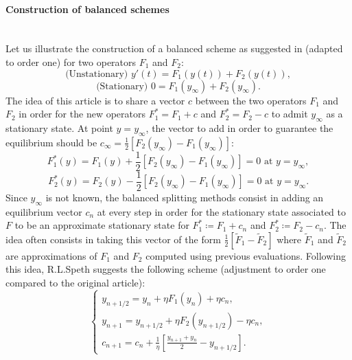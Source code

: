 \paragraph{Construction of balanced schemes}
~~\\
Let us illustrate the construction of a balanced scheme as suggested in \cite{rebalanced_splitting} (adapted to order one) for two operators $F_1$ and $F_2$:
\begin{equation*}
	\text{(Unstationary) } y'(t) = F_1(y(t)) + F_2(y(t)),
\end{equation*}
\begin{equation*}
	\text{(Stationary) } 0 = F_1(y_{\infty}) + F_2(y_{\infty}).
\end{equation*}
The idea of this article is to share a vector $c$ between the two operators $F_1$ and $F_2$ in order for the new operators $F_1^* = F_1+c$ and $F_2^*=F_2-c$ to admit $y_{\infty}$ as a stationary state. At point $y=y_{\infty}$, the vector to add in order to guarantee the equilibrium should be $c_{\infty} = \frac{1}{2} \left[F_2(y_{\infty})-F_1(y_{\infty})\right]$:
\begin{equation*}
	F_1^*(y) =  F_1(y) + \frac{1}{2} \left[F_2(y_{\infty})-F_1(y_{\infty})\right] = 0 \text{ at } y=y_{\infty},
\end{equation*}
\begin{equation*}
	F_2^*(y) =  F_2(y) - \frac{1}{2} \left[F_2(y_{\infty})-F_1(y_{\infty})\right] = 0 \text{ at } y=y_{\infty}.
\end{equation*}
Since $y_{\infty}$ is not known, the balanced splitting methods consist in adding an equilibrium vector $c_n$ at every step in order for the stationary state associated to $F$ to be an approximate stationary state for $F_1^* \coloneqq F_1+c_n$ and $F_2^*\coloneqq F_2-c_n$. The idea often consists in taking this vector of the form $\frac{1}{2}\left[\tilde{F}_1-\tilde{F}_2\right]$ where $\tilde{F}_1$ and $\tilde{F}_2$ are approximations of $F_1$ and $F_2$ computed using previous evaluations. Following this idea, R.L.Speth suggests the following scheme \cite{rebalanced_splitting} (adjustment to order one compared to the original article):
\begin{equation}
	\left\{
	\begin{array}{ll}
		y_{n+1/2} = y_n+\eta F_1(y_n)+\eta c_n, \\
		y_{n+1} = y_{n+1/2}+\eta F_2(y_{n+1/2})-\eta c_n, \\
		c_{n+1} = c_n+\frac{1}{\eta}\left[\frac{y_{n+1}+y_n}{2}-y_{n+1/2}\right].
		\label{splitting_speth}
	\end{array}
	\right.
\end{equation}
